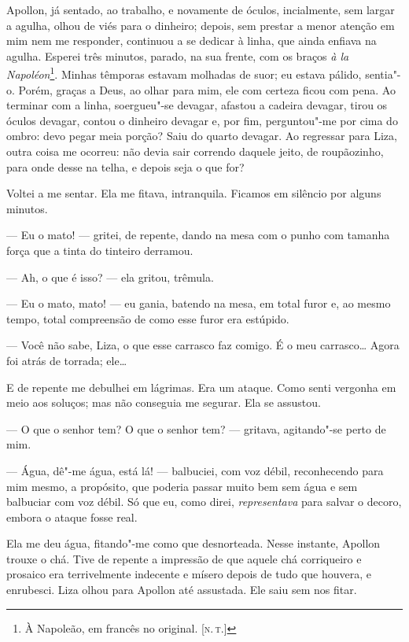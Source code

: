 Apollon, já sentado, ao trabalho, e novamente de óculos, incialmente,
sem largar a agulha, olhou de viés para o dinheiro; depois, sem prestar
a menor atenção em mim nem me responder, continuou a se dedicar à linha,
que ainda enfiava na agulha. Esperei três minutos, parado, na sua
frente, com os braços \emph{à la Napoléon}\footnote{À Napoleão, em
  francês no original. {[}\textsc{n.\,t.}{]}}. Minhas têmporas estavam
molhadas de suor; eu estava pálido, sentia"-o. Porém, graças a Deus, ao
olhar para mim, ele com certeza ficou com pena. Ao terminar com a linha,
soergueu"-se devagar, afastou a cadeira devagar, tirou os óculos devagar,
contou o dinheiro devagar e, por fim, perguntou"-me por cima do ombro:
devo pegar meia porção? Saiu do quarto devagar. Ao regressar para Liza,
outra coisa me ocorreu: não devia sair correndo daquele jeito, de
roupãozinho, para onde desse na telha, e depois seja o que for?

Voltei a me sentar. Ela me fitava, intranquila. Ficamos em silêncio por
alguns minutos.

--- Eu o mato! --- gritei, de repente, dando na mesa com o punho com tamanha
força que a tinta do tinteiro derramou.

--- Ah, o que é isso? --- ela gritou, trêmula.

--- Eu o mato, mato! --- eu gania, batendo na mesa, em total furor e, ao
mesmo tempo, total compreensão de como esse furor era estúpido.

--- Você não sabe, Liza, o que esse carrasco faz comigo. É o meu
carrasco\ldots{} Agora foi atrás de torrada; ele\ldots{}

E de repente me debulhei em lágrimas. Era um ataque. Como senti vergonha
em meio aos soluços; mas não conseguia me segurar. Ela se assustou.

--- O que o senhor tem? O que o senhor tem? --- gritava, agitando"-se perto
de mim.

--- Água, dê"-me água, está lá! --- balbuciei, com voz débil, reconhecendo
para mim mesmo, a propósito, que poderia passar muito bem sem água e sem
balbuciar com voz débil. Só que eu, como direi, \emph{representava} para
salvar o decoro, embora o ataque fosse real.

Ela me deu água, fitando"-me como que desnorteada. Nesse instante,
Apollon trouxe o chá. Tive de repente a impressão de que aquele chá
corriqueiro e prosaico era terrivelmente indecente e mísero depois de
tudo que houvera, e enrubesci. Liza olhou para Apollon até assustada.
Ele saiu sem nos fitar.

